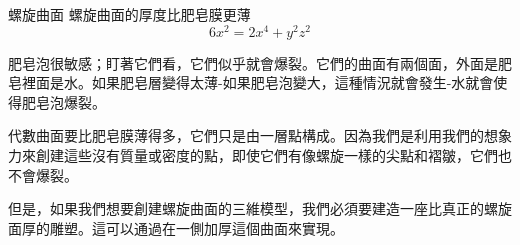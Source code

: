 \begin{surferPage}{螺旋曲面}
螺旋曲面的厚度比肥皂膜更薄\\
  \smallskip
\[6x^2	= 2x^4	+ y^2	z^2\]

\singlespacing

肥皂泡很敏感；盯著它們看，它們似乎就會爆裂。它們的曲面有兩個面，外面是肥皂裡面是水。如果肥皂層變得太薄-如果肥皂泡變大，這種情況就會發生-水就會使得肥皂泡爆裂。\\

\vspace{0,3cm}

代數曲面要比肥皂膜薄得多，它們只是由一層點構成。因為我們是利用我們的想象力來創建這些沒有質量或密度的點，即使它們有像螺旋一樣的尖點和褶皺，它們也不會爆裂。\\

\vspace{0,3cm}

但是，如果我們想要創建螺旋曲面的三維模型，我們必須要建造一座比真正的螺旋面厚的雕塑。這可以通過在一側加厚這個曲面來實現。
\end{surferPage}
